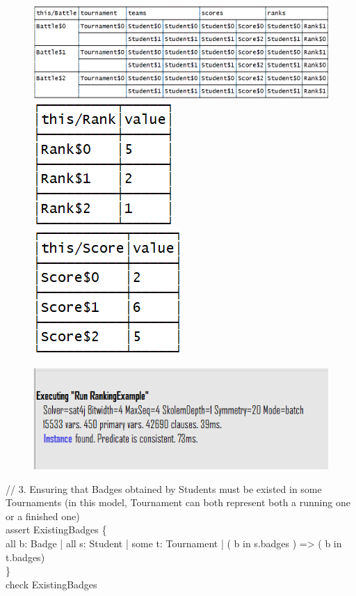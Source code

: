 \documentclass{Configuration_Files/Template}
\begin{document}
\begin{figure}[H]
\includegraphics[scale = 0.7]{Images/Alloy/2Table1.png}\\
\includegraphics[scale = 0.7]{Images/Alloy/2Table2.png}\\
\includegraphics[scale = 0.7]{Images/Alloy/2Table3.png}\\
\centering
\end{figure}
\begin{figure}[H]
\includegraphics[scale = 0.7]{Images/Alloy/2Outcome.png}\\
\centering
\end{figure}

//  3. Ensuring that Badges obtained by Students must be existed in some Tournaments (in this model, Tournament can both represent both a running one or a finished one)\\
assert ExistingBadges \{\\
all b: Badge | all s: Student | some t: Tournament | ( b in s.badges ) => ( b in t.badges)\\
\}\\
check ExistingBadges\\
\end{document}
